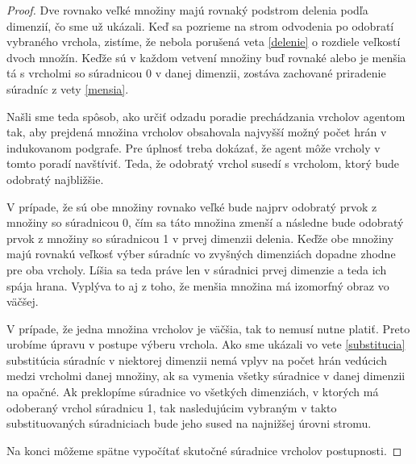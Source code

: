 \begin{proof}
Dve rovnako veľké množiny majú rovnaký podstrom
delenia podľa dimenzií, čo sme už ukázali. Keď sa pozrieme na strom
odvodenia po odobratí vybraného vrchola, zistíme, že nebola porušená veta
\ref{delenie} o rozdiele veľkostí dvoch množín. Keďže sú v každom vetvení
množiny buď rovnaké alebo je menšia tá s vrcholmi so súradnicou 0 v danej
dimenzii, zostáva zachované priradenie súradníc z vety \ref{mensia}.

Našli sme teda spôsob, ako určiť odzadu poradie prechádzania vrcholov
agentom tak, aby prejdená množina vrcholov obsahovala najvyšší možný počet
hrán v indukovanom podgrafe. Pre úplnosť treba dokázať, že agent môže
vrcholy v tomto poradí navštíviť. Teda, že odobratý vrchol susedí s
vrcholom, ktorý bude odobratý najbližšie.

V prípade, že sú obe množiny rovnako veľké bude najprv odobratý prvok z
množiny so súradnicou 0, čím sa táto množina zmenší a následne bude odobratý
prvok z množiny so súradnicou 1 v prvej dimenzii delenia. Keďže obe množiny
majú rovnakú veľkosť výber súradníc vo zvyšných dimenziách dopadne zhodne
pre oba vrcholy. Líšia sa teda práve len v súradnici prvej dimenzie a teda ich
spája hrana. Vyplýva to aj z toho, že menšia množina má izomorfný obraz vo
väčšej.

V prípade, že jedna množina vrcholov je väčšia, tak to nemusí nutne platiť.
Preto urobíme úpravu v postupe výberu vrchola. Ako sme ukázali vo vete
\ref{substitucia} substitúcia súradníc v niektorej dimenzii nemá vplyv 
na počet hrán vedúcich
medzi vrcholmi danej množiny, ak sa vymenia všetky súradnice v danej
dimenzii na opačné. Ak preklopíme súradnice vo všetkých dimenziách, v
ktorých má odoberaný vrchol súradnicu 1, tak nasledujúcim vybraným v takto
substituovaných súradniciach bude jeho sused na najnižšej úrovni stromu.

Na konci môžeme spätne vypočítať skutočné súradnice vrcholov postupnosti.
\end{proof}

\iffalse
Tak toto je blbosť
\begin{pozn}
Keď sa pozrieme na dôkaz predošlej vety a ľubovoľný súvislý úsek postupnosti
optimálnej konštrukcie, vidíme, že veta preň platí. Teda jediná podmienka,
aby bola podpostupnosť optimálna je, aby to bol súvislý úsek.

Vrcholy sú totiž do každej množiny v strome delenia pridávané na striedačku
po jednom do ľavého aj pravého podstromu v každom uzle. Neporuší sa teda
nikdy rovnováha, keď rozdiel mohutnosti množín v podstromoch ostáva najviac
1.
\end{pozn}
\fi

